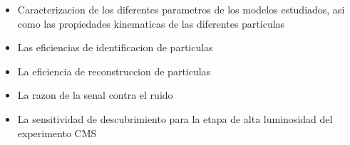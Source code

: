 \begin{itemize}
\item Caracterizacion de los diferentes parametros de los modelos estudiados, asi como las propiedades kinematicas de las diferentes particulas 
\item Las eficiencias de identificacion de particulas 
\item La eficiencia de reconstruccion de particulas 
\item La razon de la senal contra el ruido 
\item La sensitividad de descubrimiento para la etapa de alta luminosidad del experimento CMS
\end{itemize}





